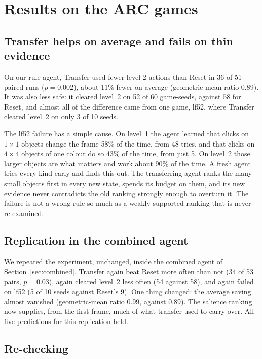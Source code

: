 \documentclass[11pt,a4paper]{article}
\begin{document}
\section{Results on the ARC games}

\subsection{Transfer helps on average and fails on thin evidence}
\label{sec:transfer}

On our rule agent, Transfer used fewer level-2 actions than Reset in 36 of 51 paired runs ($p = 0.002$), about 11\% fewer on average (geometric-mean ratio 0.89). It was also less safe: it cleared level~2 on 52 of 60 game-seeds, against 58 for Reset, and almost all of the difference came from one game, lf52, where Transfer cleared level~2 on only 3 of 10 seeds.

The lf52 failure has a simple cause. On level~1 the agent learned that clicks on $1 \times 1$ objects change the frame 58\% of the time, from 48 tries, and that clicks on $4 \times 4$ objects of one colour do so 43\% of the time, from just 5. On level~2 those larger objects are what matters and work about 90\% of the time. A fresh agent tries every kind early and finds this out. The transferring agent ranks the many small objects first in every new state, spends its budget on them, and its new evidence never contradicts the old ranking strongly enough to overturn it. The failure is not a wrong rule so much as a weakly supported ranking that is never re-examined.

\subsection{Replication in the combined agent}
\label{sec:replication}

We repeated the experiment, unchanged, inside the combined agent of Section~\ref{sec:combined}. Transfer again beat Reset more often than not (34 of 53 pairs, $p = 0.03$), again cleared level~2 less often (54 against 58), and again failed on lf52 (5 of 10 seeds against Reset's 9). One thing changed: the average saving almost vanished (geometric-mean ratio 0.99, against 0.89). The salience ranking now supplies, from the first frame, much of what transfer used to carry over. All five predictions for this replication held.

\subsection{Re-checking}
\label{sec:recheck}
\end{document}
